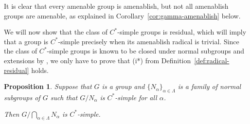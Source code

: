 \documentclass[a4paper]{amsart}
\theoremstyle{plain}
\newtheorem{proposition}[theorem]{Proposition}
\theoremstyle{definition}
\theoremstyle{remark}
\numberwithin{theorem}{section}
\begin{document}
It is clear that every amenable group is amenablish,
but not all amenablish groups are amenable, as explained in Corollary~\ref{cor:gamma-amenablish} below.

We will now show that the class of $C^*$-simple groups is residual,
which will imply that a group is $C^*$-simple precisely when its amenablish radical is trivial.
Since the class of $C^*$-simple groups is known to be closed under normal subgroups and extensions by \cite[Theorem~1.4]{BKKO},
we only have to prove that (i*) from Definition~\ref{def:radical-residual} holds.

\begin{proposition}\label{prop:cstarsimple-residual}
Suppose that $G$ is a group and $\{N_\alpha\}_{\alpha\in\Lambda}$ is a family of normal subgroups of $G$
such that $G/N_\alpha$ is $C^*$-simple for all $\alpha$.

Then $G/\bigcap_{\alpha\in\Lambda}N_\alpha$ is $C^*$-simple.
\end{proposition}
\end{document}
